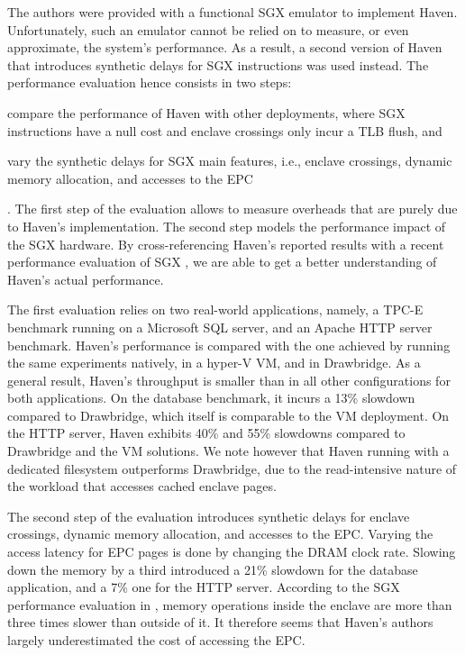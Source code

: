 The authors were provided with a functional SGX emulator to implement Haven.
Unfortunately, such an emulator cannot be relied on to measure, or even approximate, the system's performance.
As a result, a second version of Haven that introduces synthetic delays for SGX instructions was used instead.
The performance evaluation hence consists in two steps:
\begin{enumerate*}
	\item compare the performance of Haven with other deployments, where SGX instructions have a null cost and enclave crossings only incur a TLB flush, and
	\item vary the synthetic delays for SGX main features, i.e., enclave crossings, dynamic memory allocation, and accesses to the EPC
\end{enumerate*}.
The first step of the evaluation allows to measure overheads that are purely due to Haven's implementation.
The second step models the performance impact of the SGX hardware.
By cross-referencing Haven's reported results with a recent performance evaluation of SGX \cite{DBLP:conf/IEEEwisa/ZhaoSTZX16}, we are able to get a better understanding of Haven's actual performance.

The first evaluation relies on two real-world applications, namely, a TPC-E benchmark running on a Microsoft SQL server, and an Apache HTTP server benchmark.
Haven's performance is compared with the one achieved by running the same experiments natively, in a hyper-V VM, and in Drawbridge.
As a general result, Haven's throughput is smaller than in all other configurations for both applications.
On the database benchmark, it incurs a 13\% slowdown compared to Drawbridge, which itself is comparable to the VM deployment.
On the HTTP server, Haven exhibits 40\% and 55\% slowdowns compared to Drawbridge and the VM solutions.
We note however that Haven running with a dedicated filesystem outperforms Drawbridge, due to the read-intensive nature of the workload that accesses cached enclave pages.

The second step of the evaluation introduces synthetic delays for enclave crossings, dynamic memory allocation, and accesses to the EPC.
Varying the access latency for EPC pages is done by changing the DRAM clock rate.
Slowing down the memory by a third introduced a 21\% slowdown for the database application, and a 7\% one for the HTTP server.
According to the SGX performance evaluation in \cite{DBLP:conf/IEEEwisa/ZhaoSTZX16}, memory operations inside the enclave are more than three times slower than outside of it.
It therefore seems that Haven's authors largely underestimated the cost of accessing the EPC.

